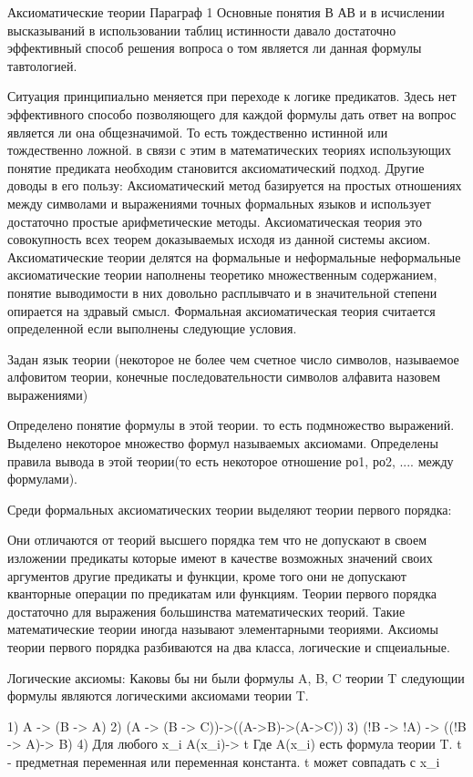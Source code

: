 Аксиоматические теории
Параграф 1 Основные понятия
В АВ и в исчислении высказываний в использовании таблиц истинности давало достаточно эффективный способ решения вопроса о том является ли данная формулы тавтологией.

Ситуация принципиально меняется при переходе к логике предикатов. Здесь нет эффективного способо позволяющего для каждой формулы дать ответ на вопрос является ли она общезначимой. То есть тождественно истинной или тождественно ложной. в связи с этим в математических теориях использующих понятие предиката необходим становится аксиоматический подход. Другие доводы в его пользу:
Аксиоматический метод базируется на простых отношениях между символами и выражениями точных формальных языков и использует достаточно простые арифметические методы. Аксиоматическая теория это совокупность всех теорем доказываемых исходя из данной системы аксиом. Аксиоматические теории делятся на формальные и неформальные неформальные аксиоматические теории наполнены теоретико множественным содержанием, понятие выводимости в них довольно расплывчато и в значительной степени опирается на здравый смысл. Формальная аксиоматическая теория считается определенной если выполнены следующие условия.

Задан язык теории (некоторое не более чем счетное число символов, называемое алфовитом теории, конечные последовательности символов алфавита назовем выражениями)

Определено понятие формулы в этой теории. то есть подмножество выражений. Выделено некоторое множество формул называемых аксиомами. Определены правила вывода в этой теории(то есть некоторое отношение ро1, ро2, .... между формулами).

Среди формальных аксиоматических теории выделяют теории первого порядка:

Они отличаются от теорий высшего порядка тем что не допускают в своем изложении предикаты которые имеют в качестве возможных значений своих аргументов другие предикаты и функции, кроме того они не допускают кванторные операции по предикатам или функциям. Теории первого порядка достаточно для выражения большинства математических теорий. Такие математические теории иногда называют элементарными теориями. Аксиомы теории первого порядка разбиваются на два класса, логические и спцеиальные.

Логические аксиомы:
Каковы бы ни были формулы A, B, C теории T следующии формулы являются логическими аксиомами теории T.

1) A -> (B -> A)
2) (A -> (B -> C))->((A->B)->(A->C))
3) (!B -> !A) -> ((!B -> A)-> B)
4) Для любого x_i A(x_i)-> t
Где A(x_i) есть формула теории T. t - предметная переменная или переменная константа. t может совпадать с x_i

